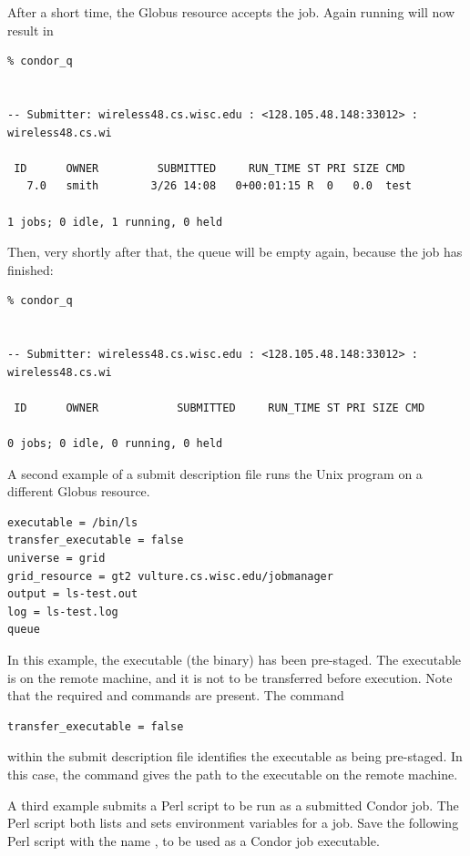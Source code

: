 After a short time, the Globus resource accepts the job.
Again running  will now result in

\footnotesize
\begin{verbatim}
% condor_q


-- Submitter: wireless48.cs.wisc.edu : <128.105.48.148:33012> : wireless48.cs.wi

 ID      OWNER         SUBMITTED     RUN_TIME ST PRI SIZE CMD
   7.0   smith        3/26 14:08   0+00:01:15 R  0   0.0  test

1 jobs; 0 idle, 1 running, 0 held
\end{verbatim}
\normalsize

Then, very shortly after that, the queue will be empty again,
because the job has finished:

\footnotesize
\begin{verbatim}
% condor_q


-- Submitter: wireless48.cs.wisc.edu : <128.105.48.148:33012> : wireless48.cs.wi

 ID      OWNER            SUBMITTED     RUN_TIME ST PRI SIZE CMD

0 jobs; 0 idle, 0 running, 0 held
\end{verbatim}
\normalsize


A second example of a submit description file runs the Unix 
program on a different Globus resource.

\footnotesize
\begin{verbatim}
executable = /bin/ls
transfer_executable = false
universe = grid
grid_resource = gt2 vulture.cs.wisc.edu/jobmanager
output = ls-test.out
log = ls-test.log
queue
\end{verbatim} 
\normalsize

In this example, the executable (the binary) has been pre-staged.
The executable is on the remote machine, and it is not to
be transferred before execution.
Note that the required 
 and 
commands are present.
The command
\begin{verbatim}
transfer_executable = false
\end{verbatim}
within the submit description file identifies the executable
as being pre-staged.
In this case, the 
command gives the path to the executable on the remote machine.

A third example submits a Perl script to be run as a submitted
Condor job.
The Perl script both lists and sets
environment variables for a job.
Save the following Perl script with the name ,
to be used as a Condor job executable.

